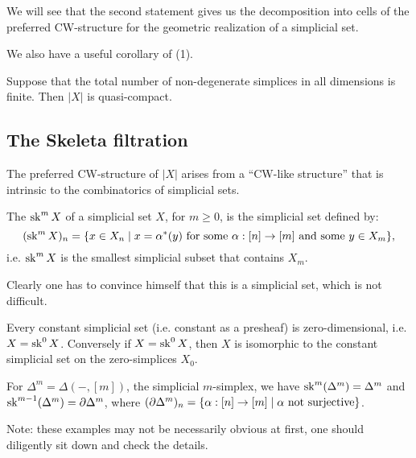 We will see that the second statement gives us the decomposition into cells of the preferred CW-structure for the geometric realization of a simplicial set.

We also have a useful corollary of (1).

\begin{corollary}\label{corollary:criterion-for-compactness-of-realization}
Suppose that the total number of non-degenerate simplices in all dimensions is finite. Then $|X|$ is quasi-compact.
\end{corollary}

\subsection{The Skeleta filtration}

The preferred CW-structure of $|X|$ arises from a \enquote{CW-like structure} that is intrinsic to the combinatorics of simplicial sets.

The  $\operatorname{sk}^m X$ of a simplicial set $X$, for $m\ge0$, is the simplicial set defined by:
\[(\operatorname{sk}^m X)_n=\{x\in X_n\mid x=\alpha^*(y)\text{ for some }\alpha:[n]\to[m]\text{ and some }y\in X_m\},\]
i.e. $\operatorname{sk}^m X$ is the smallest simplicial subset that contains $X_m$.

Clearly one has to convince himself that this is a simplicial set, which is not difficult.

\begin{example}
Every constant simplicial set (i.e. constant as a presheaf) is zero-dimensional, i.e. $X=\operatorname{sk}^0 X$. Conversely if $X=\operatorname{sk}^0 X$, then $X$ is isomorphic to the constant simplicial set on the zero-simplices $X_0$.
\end{example}

\begin{example}
For $\Delta^m=\Delta(-,[m])$, the simplicial $m$-simplex, we have $\operatorname{sk}^m(\Delta^m)=\Delta^m$ and $\operatorname{sk}^{m-1}(\Delta^m)=\partial\Delta^m$, where $(\partial\Delta^m)_n=\{\alpha:[n]\to[m]\mid\alpha\text{ not surjective}\}$.
\end{example}

Note: these examples may not be necessarily obvious at first, one should diligently sit down and check the details.
